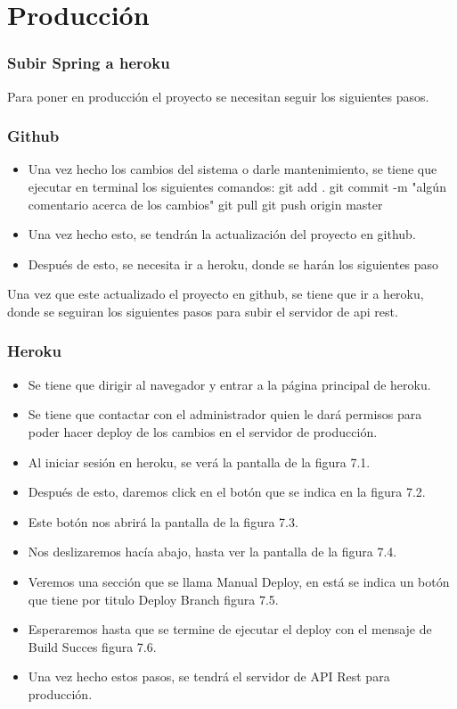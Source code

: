 \chapter{Producción}

\subsection{Subir Spring a heroku}

Para poner en producción el proyecto se necesitan seguir los siguientes pasos.

\subsection{Github}
\begin{itemize}
    \item Una vez hecho los cambios del sistema o darle mantenimiento, se tiene que ejecutar en terminal los siguientes comandos:
    git add .
    git commit -m "algún comentario acerca de los cambios"
    git pull
    git push origin master
    \item Una vez hecho esto, se tendrán la actualización del proyecto en github.
    \item Después de esto, se necesita ir a heroku, donde se harán los siguientes paso
\end{itemize}
Una vez que este actualizado el proyecto en github, se tiene que ir a heroku, donde se seguiran los siguientes pasos para subir el servidor de api rest.
\subsection{Heroku}
\begin{itemize}
    \item Se tiene que dirigir al navegador y entrar a la página principal de heroku.
    \item Se tiene que contactar con el administrador quien le dará permisos para poder hacer deploy de los cambios en el servidor de producción.
    \item Al iniciar sesión en heroku, se verá la pantalla de la figura 7.1.
    \item Después de esto, daremos click en el botón que se indica en la figura 7.2.
    \item Este botón nos abrirá la pantalla de la figura 7.3.
    \item Nos deslizaremos hacía abajo, hasta ver la pantalla de la figura 7.4.
    \item Veremos una sección que se llama Manual Deploy, en está se indica un botón que tiene por titulo Deploy Branch figura 7.5.
    \item Esperaremos hasta que se termine de ejecutar el deploy con el mensaje de Build Succes figura 7.6.
    \item Una vez hecho estos pasos, se tendrá el servidor de API Rest para producción.
\end{itemize}



